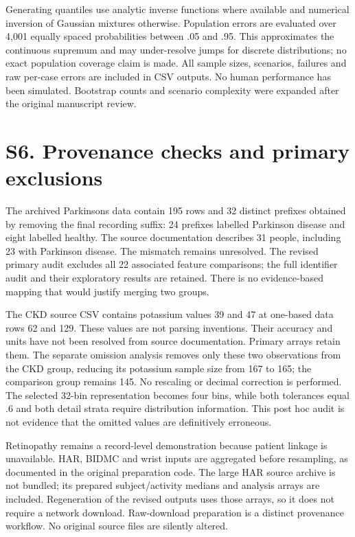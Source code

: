 \documentclass[10pt]{article}
\begin{document}
Generating quantiles use analytic inverse functions where available and numerical inversion of Gaussian mixtures otherwise. Population errors are evaluated over 4,001 equally spaced probabilities between .05 and .95. This approximates the continuous supremum and may under-resolve jumps for discrete distributions; no exact population coverage claim is made. All sample sizes, scenarios, failures and raw per-case errors are included in CSV outputs. No human performance has been simulated. Bootstrap counts and scenario complexity were expanded after the original manuscript review.

\section*{S6. Provenance checks and primary exclusions}
The archived Parkinsons data contain 195 rows and 32 distinct prefixes obtained by removing the final recording suffix: 24 prefixes labelled Parkinson disease and eight labelled healthy. The source documentation describes 31 people, including 23 with Parkinson disease.\cite{parkinsons} The mismatch remains unresolved. The revised primary audit excludes all 22 associated feature comparisons; the full identifier audit and their exploratory results are retained. There is no evidence-based mapping that would justify merging two groups.

The CKD source CSV contains potassium values 39 and 47 at one-based data rows 62 and 129.\cite{kidney} These values are not parsing inventions. Their accuracy and units have not been resolved from source documentation. Primary arrays retain them. The separate omission analysis removes only these two observations from the CKD group, reducing its potassium sample size from 167 to 165; the comparison group remains 145. No rescaling or decimal correction is performed. The selected 32-bin representation becomes four bins, while both tolerances equal .6 and both detail strata require distribution information. This post hoc audit is not evidence that the omitted values are definitively erroneous.

Retinopathy remains a record-level demonstration because patient linkage is unavailable. HAR, BIDMC and wrist inputs are aggregated before resampling, as documented in the original preparation code. The large HAR source archive is not bundled; its prepared subject/activity medians and analysis arrays are included. Regeneration of the revised outputs uses those arrays, so it does not require a network download. Raw-download preparation is a distinct provenance workflow. No original source files are silently altered.
\end{document}

